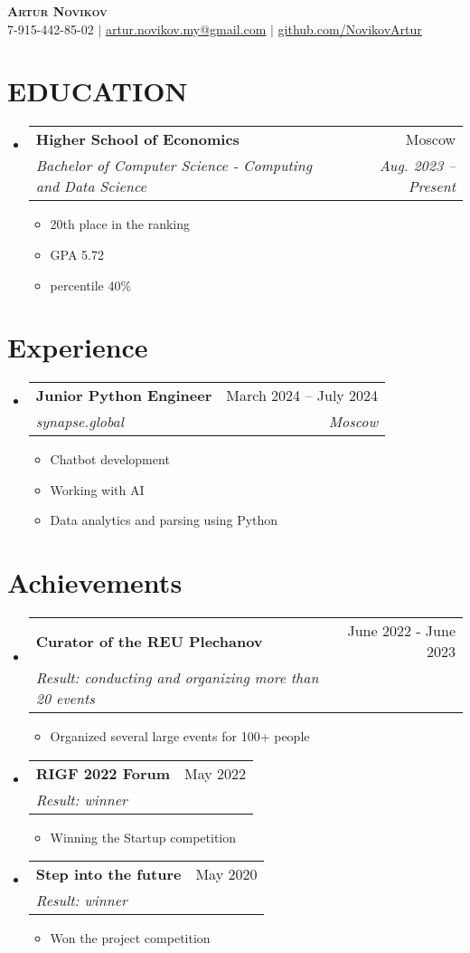 \documentclass[letterpaper,11pt]{article}
\makeatletter
\newcommand{\resumeItem}[1]{
  \item\small{
    {#1 \vspace{-2pt}}
  }
}
\newcommand{\resumeSubheading}[4]{
  \vspace{-2pt}\item
    \begin{tabular*}{0.97\textwidth}[t]{l@{\extracolsep{\fill}}r}
      \textbf{#1} & #2 \\
      \textit{\small#3} & \textit{\small #4} \\
    \end{tabular*}\vspace{-7pt}
}
\newcommand{\resumeSubHeadingListStart}{\begin{itemize}[leftmargin=0.15in, label={}]}
\newcommand{\resumeSubHeadingListEnd}{\end{itemize}}
\newcommand{\resumeItemListStart}{\begin{itemize}}
\newcommand{\resumeItemListEnd}{\end{itemize}\vspace{-5pt}}
\makeatother
\begin{document}
\begin{center}
    \textbf{\Huge \scshape Artur Novikov} \\ \vspace{1pt}
    \small 7-915-442-85-02 $|$ \href{mailto:x@x.com}{\underline{artur.novikov.my@gmail.com}} $|$
    \href{https://github.com/NovikovArtur}{\underline{github.com/NovikovArtur}}
\end{center}


\section{EDUCATION}
  \resumeSubHeadingListStart
    \resumeSubheading
      {Higher School of Economics}{Moscow}
      {Bachelor of Computer Science - Computing and Data Science}{Aug. 2023 -- Present}
      \resumeItemListStart
        \resumeItem{20th place in the ranking}
        \resumeItem{GPA 5.72}
        \resumeItem{percentile 40\%}
      \resumeItemListEnd
  \resumeSubHeadingListEnd


\section{Experience}
  \resumeSubHeadingListStart
    \resumeSubheading
      {Junior Python Engineer}{March 2024 -- July 2024}
      {synapse.global}{Moscow}
      \resumeItemListStart
        \resumeItem{Chatbot development}
        \resumeItem{Working with AI}
        \resumeItem{Data analytics and parsing using Python}
      \resumeItemListEnd
  \resumeSubHeadingListEnd


\section{Achievements}
  \resumeSubHeadingListStart
    \resumeSubheading
      {Curator of the REU Plechanov}{June 2022 - June 2023}
      {Result: conducting and organizing more than 20 events}{}
      \resumeItemListStart
        \resumeItem{Organized several large events for 100+ people}
        \resumeItemListEnd
  \resumeSubHeadingListEnd
  \resumeSubHeadingListStart
    \resumeSubheading
      {RIGF 2022 Forum}{May 2022}
      {Result: winner}{}
      \resumeItemListStart
        \resumeItem{Winning the Startup competition}
        \resumeItemListEnd
  \resumeSubHeadingListEnd
  \resumeSubHeadingListStart
    \resumeSubheading
      {Step into the future}{May 2020}
      {Result: winner}{}
      \resumeItemListStart
        \resumeItem{Won the project competition}
        \resumeItemListEnd
  \resumeSubHeadingListEnd
  
\end{document}
